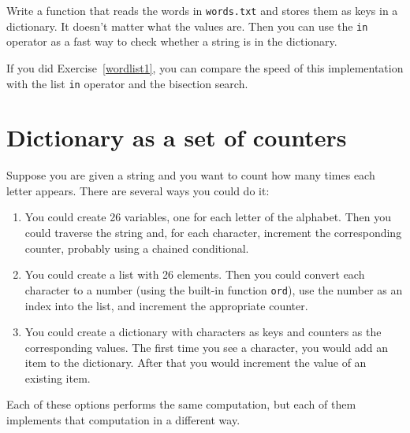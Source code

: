 \documentclass[10pt]{book}
\begin{document}

\begin{ex}
\label{wordlist2}


Write a function that reads the words in {\tt words.txt} and
stores them as keys in a dictionary.  It doesn't matter what the
values are.  Then you can use the {\tt in} operator
as a fast way to check whether a string is in
the dictionary.

If you did Exercise~\ref{wordlist1}, you can compare the speed
of this implementation with the list {\tt in} operator and the
bisection search.

\end{ex}


\section{Dictionary as a set of counters}
\label{histogram}


Suppose you are given a string and you want to count how many
times each letter appears.  There are several ways you could do it:

\begin{enumerate}

\item You could create 26 variables, one for each letter of the
alphabet.  Then you could traverse the string and, for each
character, increment the corresponding counter, probably using
a chained conditional.

\item You could create a list with 26 elements.  Then you could
convert each character to a number (using the built-in function
{\tt ord}), use the number as an index into the list, and increment
the appropriate counter.

\item You could create a dictionary with characters as keys
and counters as the corresponding values.  The first time you
see a character, you would add an item to the dictionary.  After
that you would increment the value of an existing item.

\end{enumerate}

Each of these options performs the same computation, but each
of them implements that computation in a different way.

\end{document}

